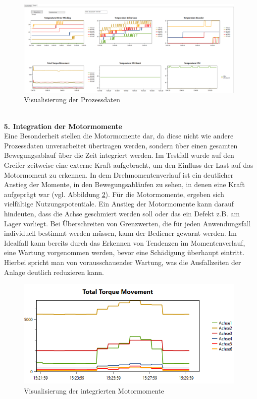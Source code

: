\documentclass[ a4paper,
                oneside,
                toc=bibliography,
                toc=listof
                ]{scrbook}
\begin{document}
   	\begin{figure}[!ht]
   		\centering
   		\includegraphics[width=1\linewidth]{./images/Prozessdaten.png}
   		\caption{Visualisierung der Prozessdaten}
   		\label{fig:Prozessdaten}
   	\end{figure}\\
   	\textbf{5. Integration der Motormomente}\\
   	Eine Besonderheit stellen die Motormomente dar, da diese nicht wie andere Prozessdaten unverarbeitet übertragen werden, sondern über einen gesamten Bewegungsablauf über die Zeit integriert werden. Im Testfall wurde auf den Greifer zeitweise eine externe Kraft aufgebracht, um den Einfluss der Last auf das Motormoment zu erkennen. In dem Drehmomentenverlauf ist ein deutlicher Anstieg der Momente, in den Bewegungsabläufen zu sehen, in denen eine Kraft aufgeprägt war (vgl. Abbildung \ref{fig:Motormomente}). Für die Motormomente, ergeben sich vielfältige Nutzungspotentiale. Ein Anstieg der Motormomente kann darauf hindeuten, dass die Achse geschmiert werden soll oder das ein Defekt z.B. am Lager vorliegt. Bei Überschreiten von Grenzwerten, die für jeden Anwendungsfall individuell bestimmt werden müssen, kann der Bediener gewarnt werden. Im Idealfall kann bereits durch das Erkennen von Tendenzen im Momentenverlauf, eine Wartung vorgenommen werden, bevor eine Schädigung überhaupt eintritt. Hierbei spricht man von vorausschauender Wartung, was die Ausfallzeiten der Anlage deutlich reduzieren kann.
   	\begin{figure}[!ht]
   		\centering
   		\includegraphics[width=0.7\linewidth]{./images/Motormomente.png}
   		\caption{Visualisierung der integrierten Motormomente}
   		\label{fig:Motormomente}
   	\end{figure}\\
\end{document}
